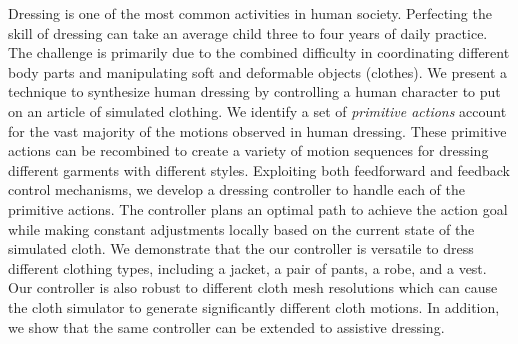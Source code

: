 Dressing is one of the most common activities in human society. Perfecting the skill of dressing can take an average child three to four years of daily practice. The challenge is primarily due to the combined difficulty in coordinating different body parts and manipulating soft and deformable objects (clothes). We present a technique to synthesize human dressing by controlling a human character to put on an article of simulated clothing. We identify a set of \emph{primitive actions} account for the vast majority of the motions observed in human dressing. These primitive actions can be recombined to create a variety of motion sequences for dressing different garments with different styles. Exploiting both feedforward and feedback control mechanisms, we develop a dressing controller to handle each of the primitive actions. The controller plans an optimal path to achieve the action goal while making constant adjustments locally based on the current state of the simulated cloth. We demonstrate that the our controller is versatile to dress different clothing types, including a jacket, a pair of pants, a robe, and a vest. Our controller is also robust to different cloth mesh resolutions which can cause the cloth simulator to generate significantly different cloth motions. In addition, we show that the same controller can be extended to assistive dressing.

